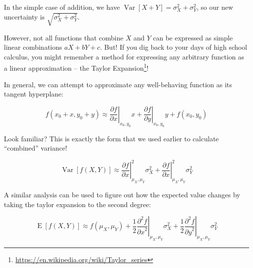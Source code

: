 \documentclass[]{article}
\renewcommand{\href}[2]{#2\footnote{\url{#1}}}
\begin{document}
In the simple case of addition, we have
\(\operatorname{Var}[X + Y] = \sigma_X^2 + \sigma_Y^2\), so our new
uncertainty is \(\sqrt{\sigma_X^2 + \sigma_Y^2}\).

However, not all functions that combine \(X\) and \(Y\) can be expressed
as simple linear combinations \(aX + bY + c\). But! If you dig back to
your days of high school calculus, you might remember a method for
expressing any arbitrary function as a linear approximation -- the
\href{https://en.wikipedia.org/wiki/Taylor_series}{Taylor Expansion}!

In general, we can attempt to approximate any well-behaving function as
its tangent hyperplane:

\[
f(x_0 + x, y_0 + y) \approx
\left.\frac{\partial f}{\partial x}\right\vert_{x_0, y_0} x +
\left.\frac{\partial f}{\partial y}\right\vert_{x_0, y_0} y +
f(x_0, y_0)
\]

Look familiar? This is exactly the form that we used earlier to
calculate ``combined'' variance!

\[
\operatorname{Var}[f(X,Y)] \approx
\left.\frac{\partial f}{\partial x}\right\vert_{\mu_X, \mu_Y}^2 \sigma_X^2 +
\left.\frac{\partial f}{\partial x}\right\vert_{\mu_X, \mu_Y}^2 \sigma_Y^2
\]

A similar analysis can be used to figure out how the expected value
changes by taking the taylor expansion to the second degree:

\[
\operatorname{E}[f(X,Y)] \approx
f(\mu_X, \mu_Y) +
\frac{1}{2} \left.\frac{\partial^2 f}{{\partial x}^2}\right\vert_{\mu_X, \mu_Y} \sigma_X^2 +
\frac{1}{2} \left.\frac{\partial^2 f}{{\partial y}^2}\right\vert_{\mu_X, \mu_Y} \sigma_Y^2
\]
\end{document}
